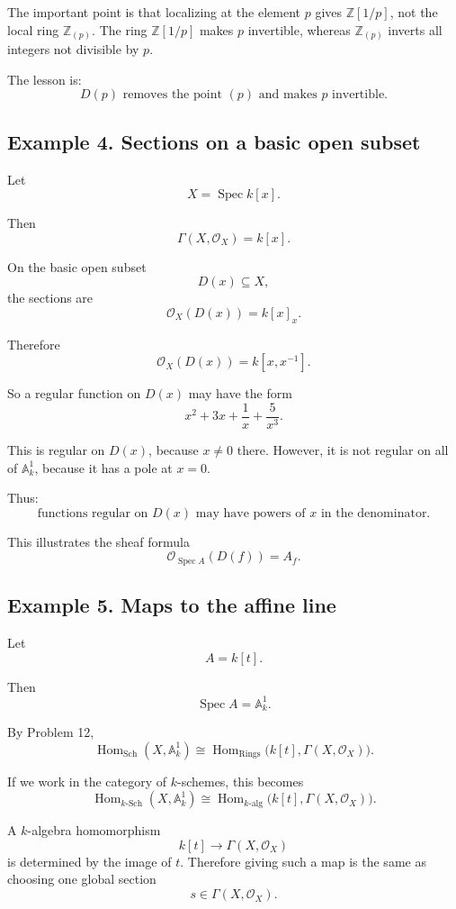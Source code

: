 \documentclass[12pt,a4paper]{article}
\DeclareMathOperator{\Hom}{Hom}
\newcommand{\Spec}{\operatorname{Spec}}
\newcommand{\Sch}{\mathrm{Sch}}
\newcommand{\Rings}{\mathrm{Rings}}
\theoremstyle{notespace}
\begin{document}
The important point is that localizing at the element \(p\) gives \(\mathbb Z[1/p]\), not the local ring \(\mathbb Z_{(p)}\). The ring \(\mathbb Z[1/p]\) makes \(p\) invertible, whereas \(\mathbb Z_{(p)}\) inverts all integers not divisible by \(p\).

The lesson is:
\[
\boxed{
	D(p)\text{ removes the point }(p)
	\text{ and makes }p\text{ invertible.}
}
\]

\subsection{Example 4. Sections on a basic open subset}

Let
\[
X=\Spec k[x].
\]

Then
\[
\Gamma(X,\mathcal O_X)=k[x].
\]

On the basic open subset
\[
D(x)\subseteq X,
\]
the sections are
\[
\mathcal O_X(D(x))=k[x]_x.
\]

Therefore
\[
\mathcal O_X(D(x))=k[x,x^{-1}].
\]

So a regular function on \(D(x)\) may have the form
\[
x^2+3x+\frac1x+\frac5{x^3}.
\]

This is regular on \(D(x)\), because \(x\neq 0\) there. However, it is not regular on all of \(\mathbb A^1_k\), because it has a pole at \(x=0\).

Thus:
\[
\boxed{
	\text{functions regular on }D(x)
	\text{ may have powers of }x\text{ in the denominator.}
}
\]

This illustrates the sheaf formula
\[
\mathcal O_{\Spec A}(D(f))=A_f.
\]

\subsection{Example 5. Maps to the affine line}

Let
\[
A=k[t].
\]

Then
\[
\Spec A=\mathbb A^1_k.
\]

By Problem 12,
\[
\Hom_{\Sch}(X,\mathbb A^1_k)
\cong
\Hom_{\Rings}\bigl(k[t],\Gamma(X,\mathcal O_X)\bigr).
\]

If we work in the category of \(k\)-schemes, this becomes
\[
\Hom_{k\text{-}\Sch}(X,\mathbb A^1_k)
\cong
\Hom_{k\text{-}\mathrm{alg}}\bigl(k[t],\Gamma(X,\mathcal O_X)\bigr).
\]

A \(k\)-algebra homomorphism
\[
k[t]\to \Gamma(X,\mathcal O_X)
\]
is determined by the image of \(t\). Therefore giving such a map is the same as choosing one global section
\[
s\in\Gamma(X,\mathcal O_X).
\]
\end{document}
